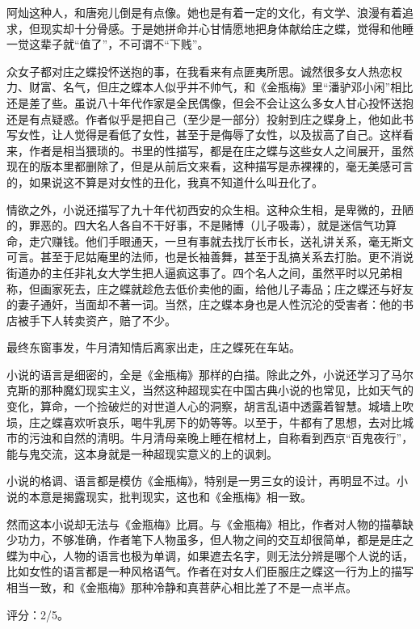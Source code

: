 阿灿这种人，和唐宛儿倒是有点像。她也是有着一定的文化，有文学、浪漫有着追求，但现实却十分骨感。于是她拼命并心甘情愿地把身体献给庄之蝶，觉得和他睡一觉这辈子就“值了”，不可谓不“下贱”。

众女子都对庄之蝶投怀送抱的事，在我看来有点匪夷所思。诚然很多女人热恋权力、财富、名气，但庄之蝶本人似乎并不帅气，和《金瓶梅》里“潘驴邓小闲”相比还是差了些。虽说八十年代作家是全民偶像，但会不会让这么多女人甘心投怀送抱还是有点疑惑。作者似乎是把自己（至少是一部分）投射到庄之蝶身上，他如此书写女性，让人觉得是看低了女性，甚至于是侮辱了女性，以及拔高了自己。这样看来，作者是相当猥琐的。书里的性描写，都是在庄之蝶与这些女人之间展开，虽然现在的版本里都删除了，但是从前后文来看，这种描写是赤裸裸的，毫无美感可言的，如果说这不算是对女性的丑化，我真不知道什么叫丑化了。

情欲之外，小说还描写了九十年代初西安的众生相。这种众生相，是卑微的，丑陋的，罪恶的。四大名人各自不干好事，不是赌博（儿子吸毒），就是迷信气功算命，走穴赚钱。他们手眼通天，一旦有事就去找厅长市长，送礼讲关系，毫无斯文可言。甚至于尼姑庵里的法师，也是长袖善舞，甚至于乱搞关系去打胎。更不消说街道办的主任非礼女大学生把人逼疯这事了。四个名人之间，虽然平时以兄弟相称，但画家死去，庄之蝶就趁危去低价卖他的画，给他儿子毒品；庄之蝶还与好友的妻子通奸，当面却不著一词。当然，庄之蝶本身也是人性沉沦的受害者：他的书店被手下人转卖资产，赔了不少。

最终东窗事发，牛月清知情后离家出走，庄之蝶死在车站。

小说的语言是细密的，全是《金瓶梅》那样的白描。除此之外，小说还学习了马尔克斯的那种魔幻现实主义，当然这种超现实在中国古典小说的也常见，比如天气的变化，算命，一个捡破烂的对世道人心的洞察，胡言乱语中透露着智慧。城墙上吹埙，庄之蝶喜欢听哀乐，喝牛乳房下的奶等等。以至于，牛都有了思想，去对比城市的污浊和自然的清明。牛月清母亲晚上睡在棺材上，自称看到西京“百鬼夜行”，能与鬼交流，这本身就是一种超现实意义的上的讽刺。

小说的格调、语言都是模仿《金瓶梅》，特别是一男三女的设计，再明显不过。小说的本意是揭露现实，批判现实，这也和《金瓶梅》相一致。

然而这本小说却无法与《金瓶梅》比肩。与《金瓶梅》相比，作者对人物的描摹缺少功力，不够准确，作者笔下人物虽多，但人物之间的交互却很简单，都是是庄之蝶为中心，人物的语言也极为单调，如果遮去名字，则无法分辨是哪个人说的话，比如女性的语言都是一种风格语气。作者在对女人们臣服庄之蝶这一行为上的描写相当一致，和《金瓶梅》那种冷静和真菩萨心相比差了不是一点半点。

评分：2/5。
